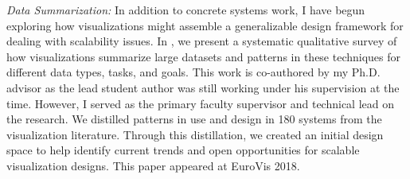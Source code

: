 \documentclass[11pt]{article}
\begin{document}
\emph{Data Summarization:} In addition to concrete systems work, I have begun exploring how visualizations might assemble a generalizable design framework for dealing with scalability issues. In \cite{sarikayadesign}, we present a systematic qualitative survey of how visualizations summarize large datasets and patterns in these techniques for different data types, tasks, and goals. This work is co-authored by my Ph.D. advisor as the lead student author was still working under his supervision at the time. However, I served as the primary faculty supervisor and technical lead on the research. We distilled patterns in use and design in 180 systems from the visualization literature. Through this distillation, we created an initial design space to help identify current trends and open opportunities for scalable visualization designs. This paper appeared at EuroVis 2018. 

\end{document}
